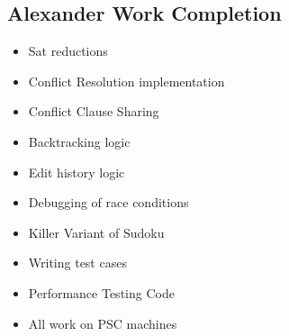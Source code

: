 \documentclass{article}
\begin{document}
\subsection{Alexander Work Completion}

\begin{itemize} 
    \item Sat reductions
    \item Conflict Resolution implementation
    \item Conflict Clause Sharing
    \item Backtracking logic
    \item Edit history logic
    \item Debugging of race conditions
    \item Killer Variant of Sudoku
    \item Writing test cases
    \item Performance Testing Code
    \item All work on PSC machines
\end{itemize}
\end{document}

